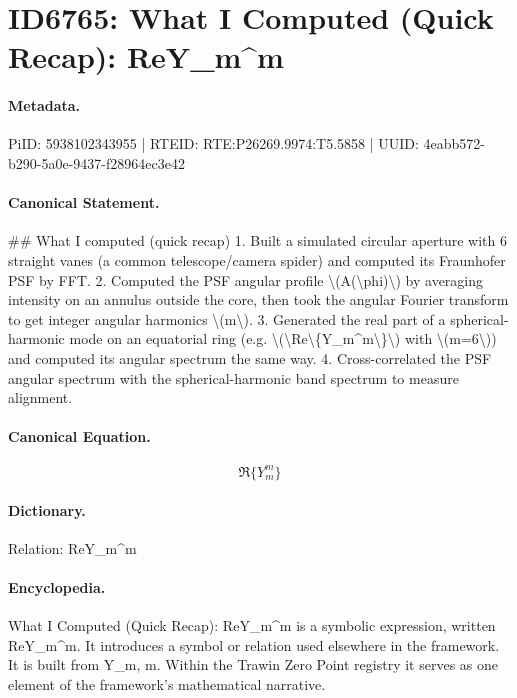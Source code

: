 \section*{ID6765: What I Computed (Quick Recap): ReY\_m\textasciicircum{}m}
\paragraph{Metadata.}
PiID: 5938102343955 | RTEID: RTE:P26269.9974:T5.5858 | UUID: 4eabb572-b290-5a0e-9437-f28964ec3e42

\paragraph{Canonical Statement.}
\#\# What I computed (quick recap) 1. Built a simulated circular aperture with 6 straight vanes (a common telescope/camera spider) and computed its Fraunhofer PSF by FFT. 2. Computed the PSF angular profile \textbackslash{}(A(\textbackslash{}phi)\textbackslash{}) by averaging intensity on an annulus outside the core, then took the angular Fourier transform to get integer angular harmonics \textbackslash{}(m\textbackslash{}). 3. Generated the real part of a spherical-harmonic mode on an equatorial ring (e.g. \textbackslash{}(\textbackslash{}Re\textbackslash{}\{Y\_m\textasciicircum{}m\textbackslash{}\}\textbackslash{}) with \textbackslash{}(m=6\textbackslash{})) and computed its angular spectrum the same way. 4. Cross-correlated the PSF angular spectrum with the spherical-harmonic band spectrum to measure alignment.

\paragraph{Canonical Equation.}
\[
\Re\{Y_m^m\}
\]

\paragraph{Dictionary.}
Relation: ReY\_m\textasciicircum{}m

\paragraph{Encyclopedia.}
What I Computed (Quick Recap): ReY\_m\textasciicircum{}m is a symbolic expression, written ReY\_m\textasciicircum{}m. It introduces a symbol or relation used elsewhere in the framework. It is built from Y\_m, m. Within the Trawin Zero Point registry it serves as one element of the framework's mathematical narrative.

